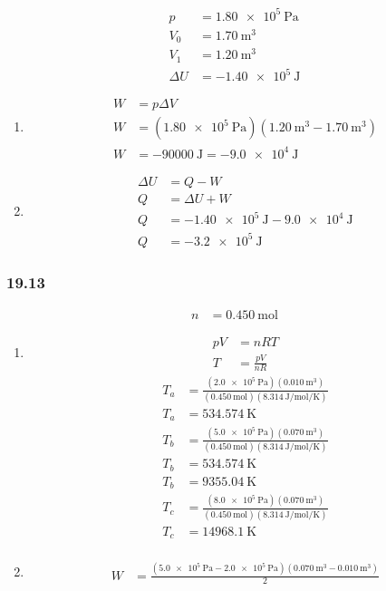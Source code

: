 \documentclass{article}
\begin{document}
\begin{align*}
	p & = \SI{1.80e5}{\pascal} \\
	V_0 & = \SI{1.70}{\meter \cubed} \\
	V_1 & = \SI{1.20}{\meter \cubed} \\
	\Delta U & = -\SI{1.40e5}{\joule}
\end{align*}
\begin{enumerate}[label = \textbf{(\alph*)}]
	\item
		\begin{align*}
			W & = p\Delta V \\
			W & = (\SI{1.80e5}{\pascal})(\SI{1.20}{\meter \cubed} - \SI{1.70}{\meter \cubed}) \\
			W & = \SI{-90000}{\joule} = \SI{-9.0e4}{\joule}
		\end{align*}
	\item
		\begin{align*}
			\Delta U & = Q - W \\
			Q & = \Delta U + W \\
			Q & = \SI{-1.40e5}{\joule} - \SI{9.0e4}{\joule} \\
			Q & = \SI{-3.2e5}{\joule}
		\end{align*}
\end{enumerate}

\subsubsection{19.13}

\begin{align*}
	n & = \SI{0.450}{\mole}
\end{align*}
\begin{enumerate}[label = \textbf{(\alph*)}]
	\item
		\begin{align*}
			pV & = nRT \\
			T & = \frac{ pV }{ nR }
		\end{align*}
		\begin{align*}
			T_a & = \frac{ (\SI{2.0e5}{\pascal})(\SI{0.010}{\meter \cubed}) }{ (\SI{0.450}{\mole})(\SI{8.314}{\joule \per \mole \per \kelvin}) } \\
			T_a & = \SI{534.574}{\kelvin} \\
			T_b & = \frac{ (\SI{5.0e5}{\pascal})(\SI{0.070}{\meter \cubed}) }{ (\SI{0.450}{\mole})(\SI{8.314}{\joule \per \mole \per \kelvin}) } \\
			T_b & = \SI{534.574}{\kelvin} \\
			T_b & = \SI{9355.04}{\kelvin} \\
			T_c & = \frac{ (\SI{8.0e5}{\pascal})(\SI{0.070}{\meter \cubed}) }{ (\SI{0.450}{\mole})(\SI{8.314}{\joule \per \mole \per \kelvin}) } \\
			T_c & = \SI{14968.1}{\kelvin} \\
		\end{align*}
	\item
		\begin{align*}
			W & = \frac{ (\SI{5.0e5}{\pascal} - \SI{2.0e5}{\pascal})(\SI{0.070}{\meter \cubed} - \SI{0.010}{\meter \cubed}) }{ 2 }
		\end{align*}
\end{enumerate}
\end{document}
